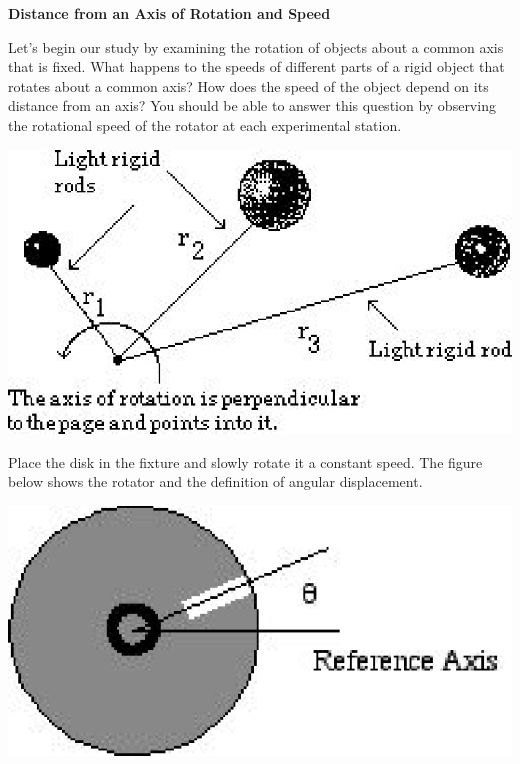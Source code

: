 \textbf{Distance from an Axis of Rotation and Speed }

Let's begin our study by examining the rotation of objects about a common axis
that is fixed. What happens to the speeds of different parts of a rigid object
that rotates about a common axis? How does the speed of the object depend on
its distance from an axis? You should be able to answer this question by observing
the rotational speed of the rotator at each experimental station.

\vspace{0.3cm}
{\par\centering \includegraphics[scale=0.8]{rotation/rotation_fig5.eps} \par}
\vspace{0.3cm}

Place the disk in the fixture and slowly rotate it a constant speed. The figure
below shows the rotator and the definition of angular displacement.

\vspace{0.3cm}
{\par\centering \includegraphics[scale=0.8]{rotation/rotation_fig6.eps} \par}
\vspace{0.3cm}

